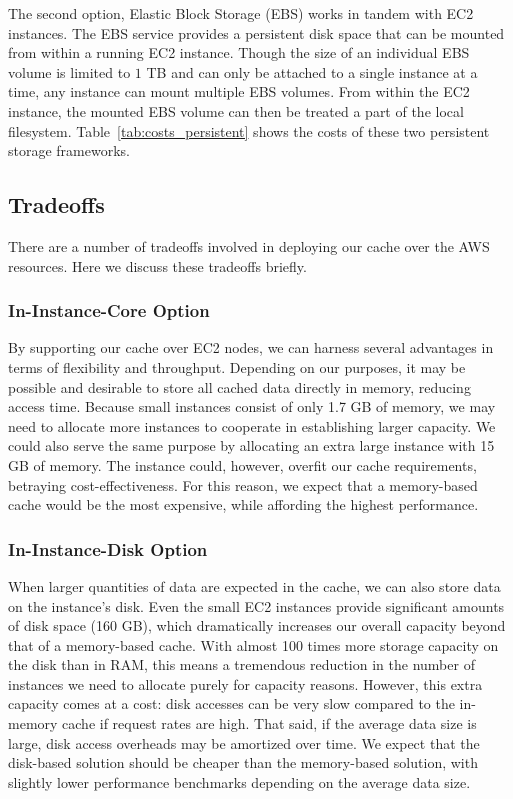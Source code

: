 The second option, Elastic Block Storage (EBS) works in tandem with EC2
instances. The EBS service provides a persistent disk space that can be mounted
from within a running EC2 instance. Though the size of an individual EBS volume
is limited to $1$ TB and can only be attached to a single instance at a time,
any instance can mount multiple EBS volumes. From within the EC2 instance, the
mounted EBS volume can then be treated a part of the local filesystem.
Table~\ref{tab:costs_persistent} shows the costs of these two persistent
storage frameworks.

\subsection{Tradeoffs} %
\label{sub:aws_tradeoffs}
There are a number of tradeoffs involved in deploying our cache over the AWS
resources. Here we discuss these tradeoffs briefly.

\subsubsection{In-Instance-Core Option} %
\label{subsub:in_instance_core}
By supporting our cache over EC2 nodes, we can harness several advantages in
terms of flexibility and throughput. Depending on our purposes, it may be
possible and desirable to store all cached data directly in memory, reducing
access time. Because small instances consist of only 1.7 GB of memory, we may
need to allocate more instances to cooperate in establishing larger capacity.
We could also serve the same purpose by allocating an extra large instance with
15 GB of memory. The instance could, however, overfit our cache requirements,
betraying cost-effectiveness. For this reason, we expect that a memory-based
cache would be the most expensive, while affording the highest performance.

\subsubsection{In-Instance-Disk Option} %
\label{subsub:in_instance_disk}
When larger quantities of data are expected in the cache, we can also store
data on the instance's disk. Even the small EC2 instances provide significant
amounts of disk space (160 GB), which dramatically increases our overall
capacity beyond that of a memory-based cache. With almost 100 times more
storage capacity on the disk than in RAM, this means a tremendous reduction in
the number of instances we need to allocate purely for capacity reasons.
However, this extra capacity comes at a cost: disk accesses can be very slow
compared to the in-memory cache if request rates are high. That said, if the
average data size is large, disk access overheads may be amortized over time.
We expect that the disk-based solution should be cheaper than the memory-based
solution, with slightly lower performance benchmarks depending on the average
data size.

